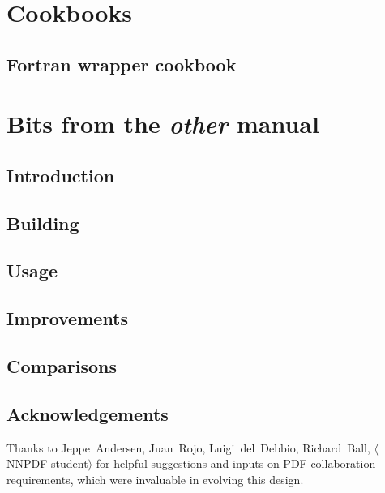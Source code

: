 \documentclass[11pt]{memoir}
\begin{document}
\chapter{Cookbooks}

\section{Fortran wrapper cookbook}



\chapter{Bits from the \emph{other} manual}



\section{Introduction}


\section{Building}


\section{Usage}


\section{Improvements}


\section{Comparisons}


\section{Acknowledgements}

Thanks to Jeppe~Andersen, Juan~Rojo, Luigi~del~Debbio, Richard~Ball,
$\langle$NNPDF student$\rangle$ for helpful suggestions and inputs on PDF
collaboration requirements, which were invaluable in evolving this design.


\end{document}

